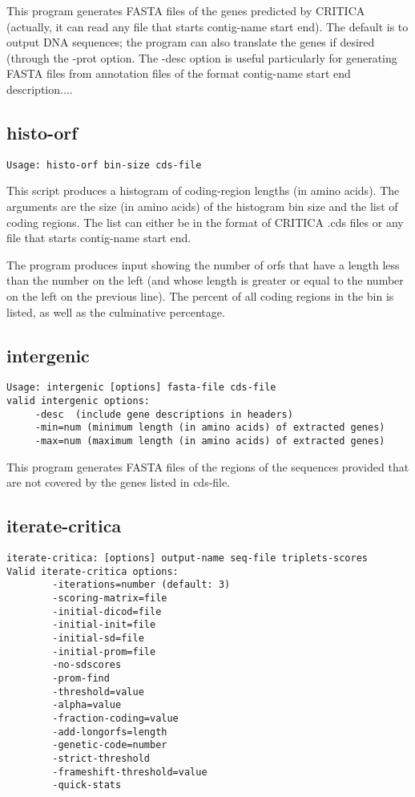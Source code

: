 \documentclass{article}
\begin{document}
This program generates FASTA files of the genes predicted by CRITICA
(actually, it can read any file that starts contig-name start end).  
The default is to output DNA sequences; the program can also
translate the genes if desired (through the -prot option.  The
-desc option is useful particularly for generating FASTA files
from annotation files of the format 
contig-name start end description....

\subsection{histo-orf}

\begin{verbatim}
Usage: histo-orf bin-size cds-file
\end{verbatim}

This script produces a histogram of coding-region lengths (in amino
acids). The arguments are the size (in amino acids) of the histogram
bin size and the list of coding regions. The list can either be in the
format of CRITICA .cds files or any file that starts 
contig-name start end.

The program produces input showing the number of orfs that have a
length less than the number on the left (and whose length is greater
or equal to the number on the left on the previous line). The percent
of all coding regions in the bin is listed, as well as the culminative
percentage.

\subsection{intergenic}

\begin{verbatim}
Usage: intergenic [options] fasta-file cds-file
valid intergenic options:
     -desc  (include gene descriptions in headers)
     -min=num (minimum length (in amino acids) of extracted genes)
     -max=num (maximum length (in amino acids) of extracted genes)
\end{verbatim}

This program generates FASTA files of the regions of the sequences
provided that are not covered by the genes listed in cds-file.

\subsection{iterate-critica}

\begin{verbatim}
iterate-critica: [options] output-name seq-file triplets-scores
Valid iterate-critica options:
        -iterations=number (default: 3)
        -scoring-matrix=file
        -initial-dicod=file
        -initial-init=file
        -initial-sd=file
        -initial-prom=file
        -no-sdscores
        -prom-find
        -threshold=value
        -alpha=value
        -fraction-coding=value
        -add-longorfs=length
        -genetic-code=number
        -strict-threshold
        -frameshift-threshold=value
        -quick-stats
\end{verbatim}
\end{document}
